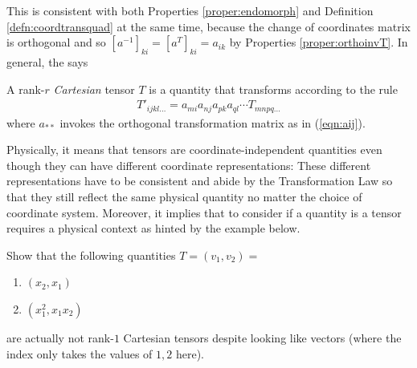 This is consistent with both Properties \ref{proper:endomorph} and Definition \ref{defn:coordtransquad} at the same time, because the change of coordinates matrix is orthogonal and so $[a^{-1}]_{ki} = [a^T]_{ki} = a_{ik}$ by Properties \ref{proper:orthoinvT}. In general, the  says
\begin{proper}
\label{proper:translaw}
A rank-$r$ \textit{Cartesian} tensor $T$ is a quantity that transforms according to the rule\footnotemark
\begin{align}
T'_{ijkl\ldots} = a_{mi}a_{nj}a_{pk}a_{ql}\cdots T_{mnpq\ldots}
\end{align}
where $a_{**}$ invokes the orthogonal transformation matrix as in (\ref{eqn:aij}).
\end{proper}
 Physically, it means that tensors are coordinate-independent quantities even though they can have different coordinate representations: These different representations have to be consistent and abide by the Transformation Law so that they still reflect the same physical quantity no matter the choice of coordinate system. Moreover, it implies that to consider if a quantity is a tensor requires a physical context as hinted by the example below.
\begin{exmp}
Show that the following quantities $T = (v_1, v_2) = $ 
\begin{enumerate}[label=(\alph*)]
    \item $(x_2,x_1)$
    \item $(x_1^2,x_1x_2)$
\end{enumerate}
are actually not rank-$1$ Cartesian tensors despite looking like vectors (where the index only takes the values of $1,2$ here).
\end{exmp}
